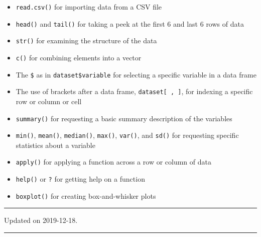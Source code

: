 \documentclass[]{tufte-handout}
\providecommand{\tightlist}{%
  \setlength{\itemsep}{0pt}\setlength{\parskip}{0pt}}
\begin{document}
\begin{itemize}
\tightlist
\item
  \texttt{read.csv()} for importing data from a CSV file\\
\item
  \texttt{head()} and \texttt{tail()} for taking a peek at the first 6
  and last 6 rows of data\\
\item
  \texttt{str()} for examining the structure of the data
\item
  \texttt{c()} for combining elements into a vector
\item
  The \texttt{\$} as in \texttt{dataset\$variable} for selecting a
  specific variable in a data frame
\item
  The use of brackets after a data frame, \texttt{dataset{[}\ ,\ {]}},
  for indexing a specific row or column or cell
\item
  \texttt{summary()} for requesting a basic summary description of the
  variables
\item
  \texttt{min()}, \texttt{mean()}, \texttt{median()}, \texttt{max()},
  \texttt{var()}, and \texttt{sd()} for requesting specific statistics
  about a variable
\item
  \texttt{apply()} for applying a function across a row or column of
  data
\item
  \texttt{help()} or \texttt{?} for getting help on a function
\item
  \texttt{boxplot()} for creating box-and-whisker plots
\end{itemize}

\begin{center}\rule{0.5\linewidth}{\linethickness}\end{center}

Updated on 2019-12-18.

\begin{center}\rule{0.5\linewidth}{\linethickness}\end{center}


\end{document}
